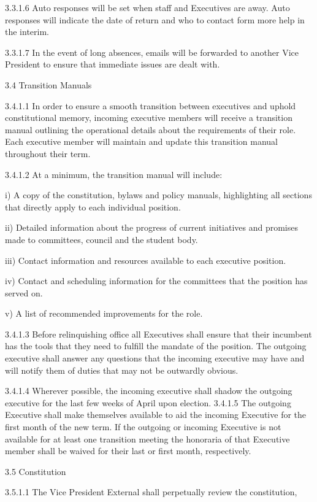  3.3.1.6 Auto responses will be set when staff and Executives are away. Auto 
 responses will indicate the date of return and who to contact form more help 
 in the interim. 
 
 3.3.1.7 In the event of long absences, emails will be forwarded to another 
 Vice President to ensure that immediate issues are dealt with. 
 
 3.4 Transition Manuals 
 
 3.4.1.1 In order to ensure a smooth transition between executives and uphold 
 constitutional memory, incoming executive members will receive a 
 transition manual outlining the operational details about the requirements of 
 their role. Each executive member will maintain and update this transition 
 manual throughout their term. 
 
 3.4.1.2 At a minimum, the transition manual will include: 
 
 i) A copy of the constitution, bylaws and policy manuals, highlighting all 
 sections that directly apply to each individual position. 
 
 ii) Detailed information about the progress of current initiatives and 
 promises made to committees, council and the student body. 
 
 iii) Contact information and resources available to each executive position. 
 
 iv) Contact and scheduling information for the committees that the position 
 has served on. 
 
 v) A list of recommended improvements for the role. 

 3.4.1.3 Before relinquishing office all Executives shall ensure that their 
 incumbent has the tools that they need to fulfill the mandate of the position. 
 The outgoing executive shall answer any questions that the incoming 
 executive may have and will notify them of duties that may not be 
 outwardly obvious. 
 
 3.4.1.4 Wherever possible, the incoming executive shall shadow the outgoing 
 executive for the last few weeks of April upon election. 
 3.4.1.5 The outgoing Executive shall make themselves available to aid the 
 incoming Executive for the first month of the new term. If the outgoing or 
 incoming Executive is not available for at least one transition meeting the 
 honoraria of that Executive member shall be waived for their last or first 
 month, respectively. 
 
 3.5 Constitution 
 
 3.5.1.1 The Vice President External shall perpetually review the constitution, 
 
